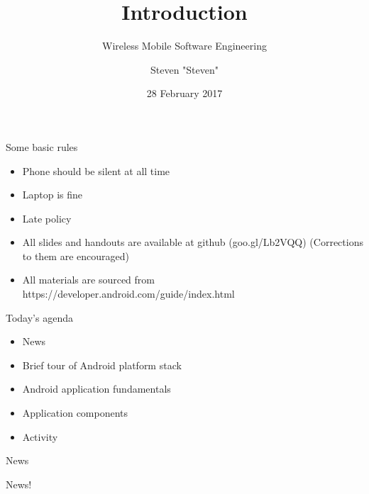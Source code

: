 \documentclass{beamer}
\title{Introduction}
\subtitle{Wireless Mobile Software Engineering}
\date{28 February 2017}
\author{Steven "Steven"}
\institute{BINUS INTERNATIONAL}
\begin{document}
  \maketitle
  
  \begin{frame}{Some basic rules}
  	\begin{itemize}
		\item Phone should be silent at all time
		\item Laptop is fine
		\item Late policy
		\item All slides and handouts are available at github (goo.gl/Lb2VQQ) (Corrections to them are encouraged)
		\item All materials are sourced from https://developer.android.com/guide/index.html
	\end{itemize}
  \end{frame}
 
  
    \begin{frame}{Today's agenda}
     \begin{itemize}
        \item News
        \item Brief tour of Android platform stack
    	\item Android application fundamentals
        \item Application components
		\item Activity
		
	\end{itemize}
  \end{frame}
  
  \begin{frame}{News}
    \begin{center}
        News!
    \end{center}
\end{frame}
  
\end{document}
